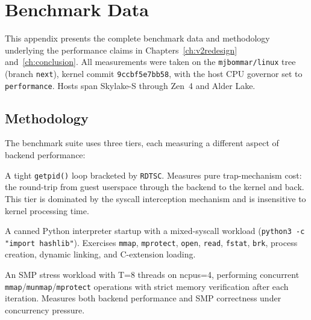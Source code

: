 \chapter{Benchmark Data}
\label{app:benchmarks}

This appendix presents the complete benchmark data and methodology
underlying the performance claims in Chapters~\ref{ch:v2redesign}
and~\ref{ch:conclusion}.  All measurements were taken on the
\texttt{mjbommar/linux} tree (branch \texttt{next}), kernel commit
\texttt{9ccbf5e7bb58}, with the host CPU governor set to
\texttt{performance}.  Hosts span Skylake-S through Zen~4 and
Alder Lake.


\section{Methodology}
\label{sec:bench-method}

The benchmark suite uses three tiers, each measuring a different
aspect of backend performance:

\begin{description}[style=nextline,leftmargin=2em]
  \item[Micro tier.]
    A tight \texttt{getpid()} loop bracketed by \texttt{RDTSC}.
    Measures pure trap-mechanism cost: the round-trip from guest
    userspace through the backend to the \UML{} kernel and back.
    This tier is dominated by the syscall interception mechanism and
    is insensitive to kernel processing time.

  \item[Application tier (Python startup).]
    A canned Python interpreter startup with a mixed-syscall workload
    (\texttt{python3 -c "import hashlib"}).  Exercises
    \texttt{mmap}, \texttt{mprotect}, \texttt{open}, \texttt{read},
    \texttt{fstat}, \texttt{brk}, process creation, dynamic linking,
    and C-extension loading.

  \item[Stress tier (mt-mini).]
    An SMP stress workload with T=8 threads on ncpus=4, performing
    concurrent \texttt{mmap}/\texttt{munmap}/\texttt{mprotect}
    operations with strict memory verification after each iteration.
    Measures both backend performance and SMP correctness under
    concurrency pressure.
\end{description}

